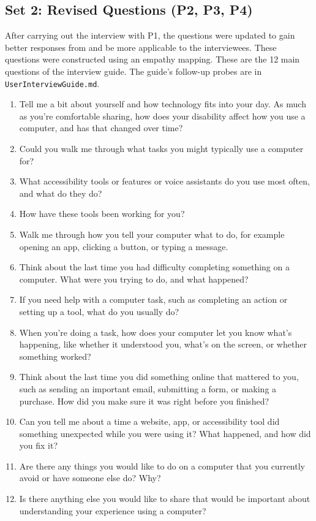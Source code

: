 \documentclass[12pt, titlepage]{article}
\begin{document}
\subsection*{Set 2: Revised Questions (P2, P3, P4)}

After carrying out the interview with P1, the questions were updated to gain better responses
from and be more applicable to the interviewees. These questions were constructed using an empathy mapping.
These are the 12 main questions of the interview guide. The guide's follow-up probes are in \texttt{UserInterviewGuide.md}.

\begin{enumerate}[label=Q\arabic*.,leftmargin=*]
    \item Tell me a bit about yourself and how technology fits into your day. As much as you're comfortable sharing, how does your disability affect how you use a computer, and has that changed over time?
    \item Could you walk me through what tasks you might typically use a computer for?
    \item What accessibility tools or features or voice assistants do you use most often, and what do they do?
    \item How have these tools been working for you?
    \item Walk me through how you tell your computer what to do, for example opening an app, clicking a button, or typing a message.
    \item Think about the last time you had difficulty completing something on a computer. What were you trying to do, and what happened?
    \item If you need help with a computer task, such as completing an action or setting up a tool, what do you usually do?
    \item When you're doing a task, how does your computer let you know what's happening, like whether it understood you, what's on the screen, or whether something worked?
    \item Think about the last time you did something online that mattered to you, such as sending an important email, submitting a form, or making a purchase. How did you make sure it was right before you finished?
    \item Can you tell me about a time a website, app, or accessibility tool did something unexpected while you were using it? What happened, and how did you fix it?
    \item Are there any things you would like to do on a computer that you currently avoid or have someone else do? Why?
    \item Is there anything else you would like to share that would be important about understanding your experience using a computer?
\end{enumerate}
\end{document}
